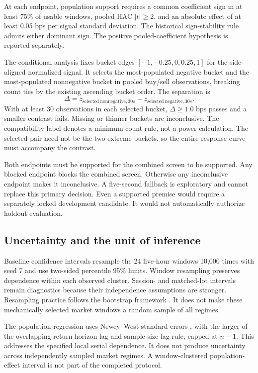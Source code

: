 At each endpoint, population support requires a common coefficient sign in at
least 75\% of usable windows, pooled HAC $|t|\ge2$, and an absolute effect of
at least 0.05 bps per signal standard deviation. The historical sign-stability
rule admits either dominant sign. The positive pooled-coefficient hypothesis
is reported separately.

The conditional analysis fixes bucket edges $[-1,-0.25,0,0.25,1]$ for the
side-aligned normalized signal. It selects the most-populated negative bucket
and the most-populated nonnegative bucket in pooled buy/sell observations,
breaking count ties by the existing ascending bucket order. The separation is
\begin{equation}
 \Delta=\overline z_{\mathrm{selected\ nonnegative},30s}
       -\overline z_{\mathrm{selected\ negative},30s}.
\end{equation}
With at least 30 observations in each selected bucket, $\Delta\ge1.0$ bps
passes and a smaller contrast fails. Missing or thinner buckets are
inconclusive. The compatibility label  denotes a
minimum-count rule, not a power calculation. The selected pair need not be the
two extreme buckets, so the entire response curve must accompany the contrast.

Both endpoints must be supported for the combined screen to be supported.
Any blocked endpoint blocks the combined screen. Otherwise any inconclusive
endpoint makes it inconclusive. A five-second fallback is exploratory and
cannot replace this primary decision. Even a supported premise would require a
separately locked development candidate. It would not automatically authorize
holdout evaluation.

\subsection{Uncertainty and the unit of inference}

Baseline confidence intervals resample the 24 five-hour windows 10,000 times
with seed 7 and use two-sided percentile 95\% limits. Window resampling
preserves dependence within each observed cluster. Session- and matched-lot
intervals remain diagnostics because their independence assumptions are
stronger. Resampling practice follows the bootstrap framework
\citep{efron1979}. It does not make these mechanically selected market windows
a random sample of all regimes.

The population regression uses Newey--West standard errors
\citep{neweywest1987}, with the larger of the overlapping-return horizon lag
and sample-size lag rule, capped at $n-1$. This addresses the specified local
serial dependence. It does not produce uncertainty across independently
sampled market regimes. A window-clustered population-effect interval is not
part of the completed protocol.

